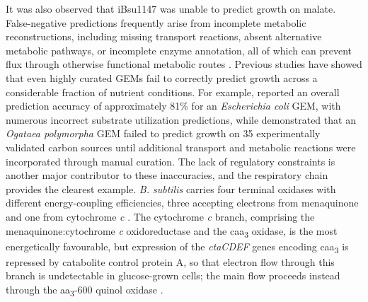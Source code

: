\documentclass[11pt, a4paper]{article}
\begin{document}
It was also observed that iBsu1147 was unable to predict growth on malate. False-negative predictions frequently arise from incomplete metabolic reconstructions, including missing transport reactions, absent alternative metabolic pathways, or incomplete enzyme annotation, all of which can prevent flux through otherwise functional metabolic routes \parencite{bernstein-2021}.
Previous studies have showed that even highly curated GEMs fail to correctly predict growth across a considerable fraction of nutrient conditions. For example, \parencite{christadore-2014} reported an overall prediction accuracy of approximately 81\% for an \textit{Escherichia coli} GEM, with numerous incorrect substrate utilization predictions, while \parencite{liebal-2021} demonstrated that an \textit{Ogataea polymorpha} GEM failed to predict growth on 35 experimentally validated carbon sources until additional transport and metabolic reactions were incorporated through manual curation.
The lack of regulatory constraints is another major contributor to these inaccuracies, and the respiratory chain provides the clearest example. \textit{B. subtilis} carries four terminal oxidases with different energy-coupling efficiencies, three accepting electrons from menaquinone and one from cytochrome \textit{c} \parencite{winstedt-2000}. The cytochrome \textit{c} branch, comprising the menaquinone:cytochrome \textit{c} oxidoreductase and the caa\textsubscript{3} oxidase, is the most energetically favourable, but expression of the \textit{ctaCDEF} genes encoding caa\textsubscript{3} is repressed by catabolite control protein A, so that electron flow through this branch is undetectable in glucose-grown cells; the main flow proceeds instead through the aa\textsubscript{3}-600 quinol oxidase \parencite{oh-2007, tobisch-1999}.
\end{document}
